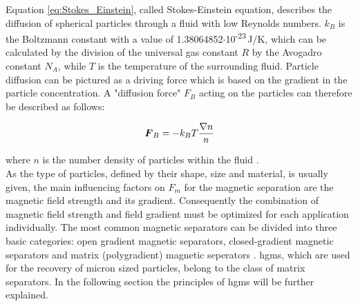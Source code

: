 Equation \ref{eq:Stokes_Einstein}, called Stokes-Einstein equation, describes the diffusion of spherical particles through a fluid with low Reynolds numbers. $k_{B}$ is the Boltzmann constant with a value of 1.38064852$\cdotp$10\textsuperscript{-23}\,J/K, which can be calculated by the division of the universal gas constant $R$ by the Avogadro constant $N_{A}$, while $T$ is the temperature of the surrounding fluid. Particle diffusion can be pictured as a driving force which is based on the gradient in the particle concentration. 
A "diffusion force" $F_{B}$ acting on the particles can therefore be described as follows:

\begin{equation}
\label{eq:diff_force}
\centering
\boldsymbol{F}_{B} = -k_{B}T\frac{\nabla n}{n}
\end{equation}

where $n$ is the number density of particles within the fluid \cite{choomphon2017simulation,moeser2004high,fletcher1991fine}. \\
As the type of particles, defined by their shape, size and material, is usually given, the main influencing factors on $F_{m}$ for the magnetic separation are the magnetic field strength and its gradient. Consequently the combination of magnetic field strength and field gradient must be optimized for each application individually. The most common magnetic separators can be divided into three basic categories: open gradient magnetic separators, closed-gradient magnetic separators and matrix (polygradient) magnetic seperators \cite{svoboda2004magnetic}. \Gls{hgms}, which are used for the recovery of micron sized particles, belong to the class of matrix separators. In the following section the principles of \gls{hgms} will be further explained.  


